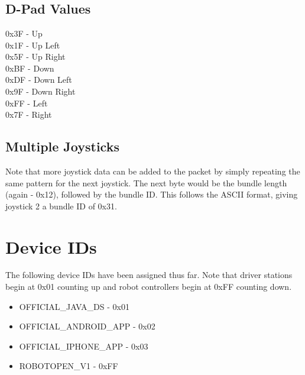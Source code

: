 \documentclass[11pt]{article} %
\begin{document}
\section*{}

\subsection{D-Pad Values}
0x3F - Up \\
0x1F - Up Left \\
0x5F - Up Right \\
0xBF - Down \\
0xDF - Down Left \\
0x9F - Down Right \\
0xFF - Left \\
0x7F - Right

\subsection{Multiple Joysticks}
Note that more joystick data can be added to the packet by simply repeating the same pattern for the next joystick. The next byte would be the bundle length (again - 0x12), followed by the bundle ID. This follows the ASCII format, giving joystick 2 a bundle ID of 0x31.

\newpage


\section*{}

\section{Device IDs}

The following device IDs have been assigned thus far. Note that driver stations begin at 0x01 counting up and robot controllers begin at 0xFF counting down.

\begin{itemize}
\item OFFICIAL\_JAVA\_DS - 0x01
\item OFFICIAL\_ANDROID\_APP - 0x02
\item OFFICIAL\_IPHONE\_APP - 0x03
\item ROBOTOPEN\_V1 - 0xFF
\end{itemize}
\end{document}
